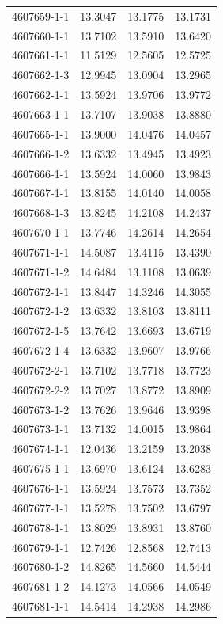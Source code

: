 \begin{longtable}{lrrr}
4607659-1-1 & 13.3047 & 13.1775 & 13.1731 \\
4607660-1-1 & 13.7102 & 13.5910 & 13.6420 \\
4607661-1-1 & 11.5129 & 12.5605 & 12.5725 \\
4607662-1-3 & 12.9945 & 13.0904 & 13.2965 \\
4607662-1-1 & 13.5924 & 13.9706 & 13.9772 \\
4607663-1-1 & 13.7107 & 13.9038 & 13.8880 \\
4607665-1-1 & 13.9000 & 14.0476 & 14.0457 \\
4607666-1-2 & 13.6332 & 13.4945 & 13.4923 \\
4607666-1-1 & 13.5924 & 14.0060 & 13.9843 \\
4607667-1-1 & 13.8155 & 14.0140 & 14.0058 \\
4607668-1-3 & 13.8245 & 14.2108 & 14.2437 \\
4607670-1-1 & 13.7746 & 14.2614 & 14.2654 \\
4607671-1-1 & 14.5087 & 13.4115 & 13.4390 \\
4607671-1-2 & 14.6484 & 13.1108 & 13.0639 \\
4607672-1-1 & 13.8447 & 14.3246 & 14.3055 \\
4607672-1-2 & 13.6332 & 13.8103 & 13.8111 \\
4607672-1-5 & 13.7642 & 13.6693 & 13.6719 \\
4607672-1-4 & 13.6332 & 13.9607 & 13.9766 \\
4607672-2-1 & 13.7102 & 13.7718 & 13.7723 \\
4607672-2-2 & 13.7027 & 13.8772 & 13.8909 \\
4607673-1-2 & 13.7626 & 13.9646 & 13.9398 \\
4607673-1-1 & 13.7132 & 14.0015 & 13.9864 \\
4607674-1-1 & 12.0436 & 13.2159 & 13.2038 \\
4607675-1-1 & 13.6970 & 13.6124 & 13.6283 \\
4607676-1-1 & 13.5924 & 13.7573 & 13.7352 \\
4607677-1-1 & 13.5278 & 13.7502 & 13.6797 \\
4607678-1-1 & 13.8029 & 13.8931 & 13.8760 \\
4607679-1-1 & 12.7426 & 12.8568 & 12.7413 \\
4607680-1-2 & 14.8265 & 14.5660 & 14.5444 \\
4607681-1-2 & 14.1273 & 14.0566 & 14.0549 \\
4607681-1-1 & 14.5414 & 14.2938 & 14.2986 \\

\end{longtable}
